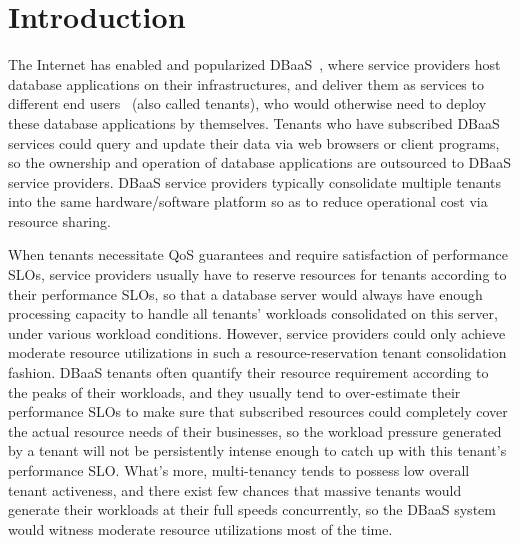 \section{Introduction}\label{sec:Introduction}

The Internet has enabled and popularized DBaaS~\cite{PDBaaS,RMTD,salesforce,Force,MTDB1,DBMaaS,DBaaS}, where service providers host database applications on their infrastructures, and deliver them as services to different end users ~(also called tenants), who would otherwise need to deploy these database applications by themselves. Tenants who have subscribed DBaaS services could query and update their data via web browsers or client programs, so the ownership and operation of database applications are outsourced to DBaaS service providers. DBaaS service providers typically consolidate multiple tenants into the same hardware/software platform so as to reduce operational cost via resource sharing.

When tenants necessitate QoS guarantees and require satisfaction of performance SLOs, service providers usually have to reserve resources for tenants according to their performance SLOs, so that a database server would always have enough processing capacity to handle all tenants' workloads consolidated on this server, under various workload conditions. However, service providers could only achieve moderate resource utilizations in such a resource-reservation tenant consolidation fashion. DBaaS tenants often quantify their resource requirement according to the peaks of their workloads, and they usually tend to over-estimate their performance SLOs to make sure that subscribed resources could completely cover the actual resource needs of their businesses, so the workload pressure generated by a tenant will not be persistently intense enough to catch up with this tenant's performance SLO. What's more, multi-tenancy tends to possess low overall tenant activeness, and there exist few chances that massive tenants would generate their workloads at their full speeds concurrently, so the DBaaS system would witness moderate resource utilizations most of the time.

